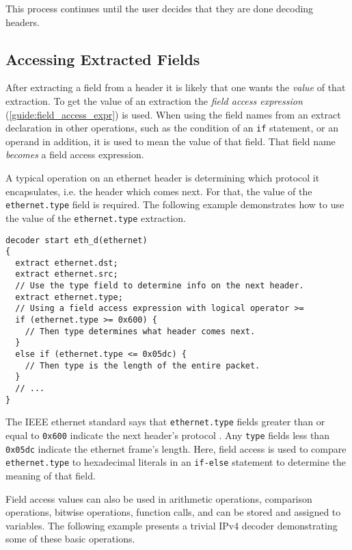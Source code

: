 This process continues until the user decides that they are done decoding headers.

\subsection{Accessing Extracted Fields} \label{tut:decoder_access}

After extracting a field from a header it is likely that one wants the
\textit{value} of that extraction. To get the value of an extraction
the \textit{field access expression} (\ref{guide:field_access_expr}) is used. When
using the field names from an extract declaration in other operations, such as
the condition of an \texttt{if} statement, or an operand in addition, it is used to
mean the value of that field. That field name \textit{becomes} a field access
expression.

A typical operation on an ethernet header is determining which protocol
it encapsulates, i.e. the header which comes next. For that, the value of the \texttt{ethernet.type} field is required.
The following example demonstrates how to use the value of the \texttt{ethernet.type} extraction.

\begin{codepage}
\begin{lstlisting}
decoder start eth_d(ethernet)
{
  extract ethernet.dst;
  extract ethernet.src;
  // Use the type field to determine info on the next header.
  extract ethernet.type;
  // Using a field access expression with logical operator >=
  if (ethernet.type >= 0x600) {
    // Then type determines what header comes next.
  }
  else if (ethernet.type <= 0x05dc) {
    // Then type is the length of the entire packet.
  }
  // ...
}
\end{lstlisting}
\end{codepage}

The IEEE ethernet standard says that \texttt{ethernet.type} fields greater than or equal
to \texttt{0x600} indicate the next header's protocol \cite{eth_std}. Any \texttt{type}
fields less than \texttt{0x05dc} indicate the ethernet frame's length. Here, field access is used to compare \texttt{ethernet.type} to hexadecimal literals in an
\texttt{if-else} statement to determine the meaning of that field.

Field access values can also be used in arithmetic operations, comparison operations, bitwise operations, function calls,
and can be stored and assigned to variables. The following example presents
a trivial IPv4 decoder demonstrating some of these basic operations.

